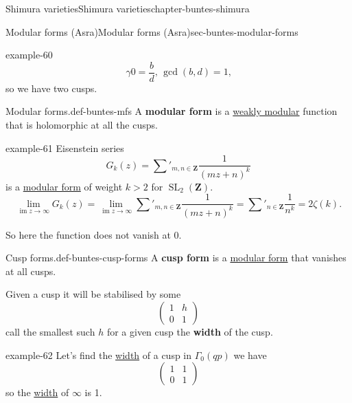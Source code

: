 \documentclass[oneside,10pt,]{book}
\newcommand{\terminology}[1]{\textbf{#1}}
\numberwithin{equation}{section}
\newcommand{\ZZ}{\mathbf{Z}}
\DeclareMathOperator{\im}{im}
\DeclareMathOperator{\SL}{SL}
\newcommand{\gt}{>}
\newcommand{\amp}{&}
\begin{document}
\begin{chapterptx}{Shimura varieties}{}{Shimura varieties}{}{}{chapter-buntes-shimura}
\begin{sectionptx}{Modular forms (Asra)}{}{Modular forms (Asra)}{}{}{sec-buntes-modular-forms}
\begin{example}{}{example-60}
\begin{equation*}
\gamma 0  = \frac{b}{d}, \, \gcd(b,d)  =1\text{,}
\end{equation*}
so we have two cusps.%
\end{example}
\begin{definition}{Modular forms.}{def-buntes-mfs}%
\hypertarget{p-1059}{}%
A \terminology{modular form} is  a \hyperref[def-buntes-weak-modular]{weakly modular} function that is holomorphic at all the cusps.%
\end{definition}
\begin{example}{}{example-61}%
\hypertarget{p-1060}{}%
Eisenstein series%
\begin{equation*}
G_k(z) = \sum'_{m,n\in \ZZ} \frac{1}{(mz+n)^k}
\end{equation*}
is a \hyperref[def-buntes-mfs]{modular form} of weight \(k \gt 2\) for \(\SL_2(\ZZ)\).%
\begin{equation*}
\lim_{\im z\to \infty} G_k(z) = \lim_{\im z\to \infty} \sum'_{m,n\in \ZZ} \frac{1}{(mz+n)^k} = \sum'_{n\in \ZZ} \frac{1}{n^k} = 2\zeta(k)\text{.}
\end{equation*}
%
\par
\hypertarget{p-1061}{}%
So here the function does not vanish at 0.%
\end{example}
\begin{definition}{Cusp forms.}{def-buntes-cusp-forms}%
\hypertarget{p-1062}{}%
A \terminology{cusp form} is a \hyperref[def-buntes-mfs]{modular form} that vanishes at all cusps.%
\end{definition}
\hypertarget{p-1063}{}%
Given a cusp it will be stabilised by some%
\begin{equation*}
\begin{pmatrix} 1\amp h \\ 0 \amp 1 \end{pmatrix}
\end{equation*}
call the smallest such \(h\) for a given cusp the \terminology{width} of the cusp.%
\begin{example}{}{example-62}%
\hypertarget{p-1064}{}%
Let's find the \hyperref[def-buntes-cusp-forms]{width} of a cusp in \(\Gamma_0(qp)\) we have%
\begin{equation*}
\begin{pmatrix} 1\amp 1 \\ 0 \amp 1 \end{pmatrix}
\end{equation*}
so the \hyperref[def-buntes-cusp-forms]{width} of \(\infty\) is 1.%
\par

\end{example}
\end{sectionptx}
\end{chapterptx}
\end{document}
